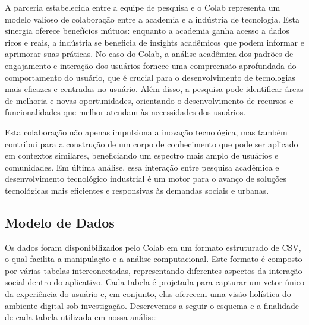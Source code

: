 A parceria estabelecida entre a equipe de pesquisa e o Colab representa um modelo valioso de colaboração entre a academia e a indústria de tecnologia. Esta sinergia oferece benefícios mútuos: enquanto a academia ganha acesso a dados ricos e reais, a indústria se beneficia de insights acadêmicos que podem informar e aprimorar suas práticas. No caso do Colab, a análise acadêmica dos padrões de engajamento e interação dos usuários fornece uma compreensão aprofundada do comportamento do usuário, que é crucial para o desenvolvimento de tecnologias mais eficazes e centradas no usuário. Além disso, a pesquisa pode identificar áreas de melhoria e novas oportunidades, orientando o desenvolvimento de recursos e funcionalidades que melhor atendam às necessidades dos usuários. 

Esta colaboração não apenas impulsiona a inovação tecnológica, mas também contribui para a construção de um corpo de conhecimento que pode ser aplicado em contextos similares, beneficiando um espectro mais amplo de usuários e comunidades. Em última análise, essa interação entre pesquisa acadêmica e desenvolvimento tecnológico industrial é um motor para o avanço de soluções tecnológicas mais eficientes e responsivas às demandas sociais e urbanas.

\subsection*{Modelo de Dados}
\label{sec:modelo_de_dados}

Os dados foram disponibilizados pelo Colab em um formato estruturado de CSV, o qual facilita a manipulação e a análise computacional. Este formato é composto por várias tabelas interconectadas, representando diferentes aspectos da interação social dentro do aplicativo. Cada tabela é projetada para capturar um vetor único da experiência do usuário e, em conjunto, elas oferecem uma visão holística do ambiente digital sob investigação. Descrevemos a seguir o esquema e a finalidade de cada tabela utilizada em nossa análise:

